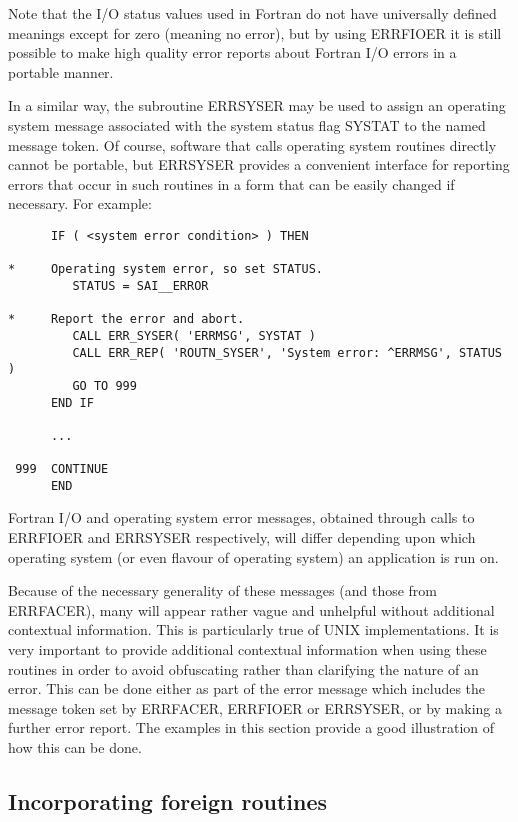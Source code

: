 \documentclass[twoside,11pt]{article}
\newcommand{\xlabel}[1]{}
\renewcommand{\_}{\texttt{\symbol{95}}}
\begin{document}
Note that the I/O status values used in Fortran do not have universally
defined meanings except for zero (meaning no error), but by using
ERR\_FIOER it is still possible to make high quality error reports about
Fortran I/O errors in a portable manner.

In a similar way, the subroutine ERR\_SYSER may be used to assign an
operating system message associated with the
system status flag SYSTAT to the named message token.
Of course, software that calls operating system routines directly cannot be
portable, but ERR\_SYSER provides a convenient interface for reporting
errors that occur in such routines in a form that can be easily changed if
necessary.
For example:

\begin {small}
\begin{verbatim}
      IF ( <system error condition> ) THEN

*     Operating system error, so set STATUS.
         STATUS = SAI__ERROR

*     Report the error and abort.
         CALL ERR_SYSER( 'ERRMSG', SYSTAT )
         CALL ERR_REP( 'ROUTN_SYSER', 'System error: ^ERRMSG', STATUS )
         GO TO 999
      END IF

      ...

 999  CONTINUE
      END
\end{verbatim}
\end {small}

Fortran I/O and operating system error messages, obtained through calls to
ERR\_FIOER and ERR\_SYSER respectively, will differ depending upon which
operating system (or even flavour of operating system) an application is run on.

Because of the necessary generality of these messages (and those from
ERR\_FACER), many will appear rather vague and unhelpful without additional
contextual information.
This is particularly true of UNIX implementations.
It is very important to provide additional contextual information when using
these routines in order to avoid obfuscating rather than clarifying the nature
of an error.
This can be done either as part of the error message which includes the message
token set by ERR\_FACER, ERR\_FIOER or ERR\_SYSER, or by making a further
error report.
The examples in this section provide a good illustration of how this can
be done.


\subsection{\xlabel{incorporating_foreign_routines}Incorporating foreign routines \label{foreign_sect}}
\end{document}
